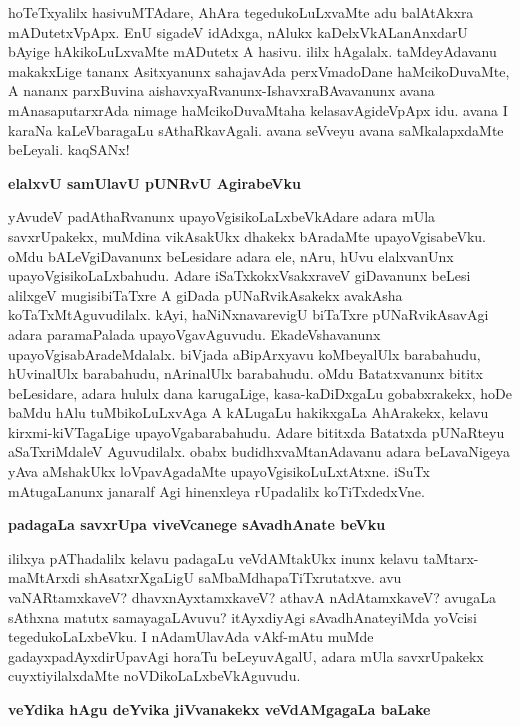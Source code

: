 \noindent
hoTeTxyalilx hasivuMTAdare, AhAra tegedukoLuLxvaMte adu balAtAkxra mADutetxVpApx. EnU sigadeV idAdxga, nAlukx kaDelxVkALanAnxdarU bAyige hAkikoLuLxvaMte mADutetx A hasivu. ililx hAgalalx. taMdeyAdavanu makakxLige tananx Asitxyanunx sahajavAda perxVmadoDane haMcikoDuvaMte, A nananx parxBuvina aishavxyaRvanunx-IshavxraBAvavanunx avana mAnasaputarxrAda nimage haMcikoDuvaMtaha kelasavAgideVpApx idu. avana I karaNa kaLeVbaragaLu sAthaRkavAgali. avana seVveyu avana saMkalapxdaMte beLeyali. kaqSANx!

\newpage

{\bigskip
\noindent
{\large\bf elalxvU samUlavU pUNRvU AgirabeVku}}\label{page190b}
\medskip

\noindent
yAvudeV padAthaRvanunx upayoVgisikoLaLxbeVkAdare adara mUla savxrUpakekx, muMdina vikAsakUkx dhakekx bAradaMte upayoVgisabeVku. oMdu bALeVgiDavanunx beLesidare adara ele, nAru, hUvu elalxvanUnx upayoVgisikoLaLxbahudu. Adare iSaTxkokxVsakxraveV giDavanunx beLesi alilxgeV mugisibiTaTxre A giDada pUNaRvikAsakekx avakAsha koTaTxMtAguvudilalx. kAyi, haNiNxnavarevigU biTaTxre pUNaRvikAsavAgi adara paramaPalada upayoVgavAguvudu. EkadeVshavanunx upayoVgisabAradeMdalalx. biVjada aBipArxyavu koMbeyalUlx barabahudu, hUvinalUlx barabahudu, nArinalUlx barabahudu. oMdu Batatxvanunx bititx beLesidare, adara hululx dana karugaLige, kasa-kaDiDxgaLu gobabxrakekx, hoDe baMdu hAlu tuMbikoLuLxvAga A kALugaLu hakikxgaLa AhArakekx, kelavu kirxmi-kiVTagaLige upayoVgabarabahudu. Adare bititxda Batatxda pUNaRteyu aSaTxriMdaleV Aguvudilalx. obabx budidhxvaMtanAdavanu adara beLavaNigeya yAva aMshakUkx loVpavAgadaMte upayoVgisikoLuLxtAtxne. iSuTx mAtugaLanunx janaralf Agi hinenxleya rUpadalilx koTiTxdedxVne.

\eject

{\bigskip
\noindent
{\large\bf padagaLa savxrUpa viveVcanege sAvadhAnate beVku}}\label{page191}
\medskip

\noindent
ililxya pAThadalilx kelavu padagaLu veVdAMtakUkx inunx kelavu taMtarx-maMtArxdi shAsatxrXgaLigU saMbaMdhapaTiTxrutatxve. avu vaNARtamxkaveV? dhavxnAyxtamxkaveV? athavA nAdAtamxkaveV? avugaLa sAthxna matutx samayagaLAvuvu? itAyxdiyAgi sAvadhAnateyiMda yoVcisi tegedukoLaLxbeVku. I nAdamUlavAda vAkf-mAtu muMde gadayxpadAyxdirUpavAgi horaTu beLeyuvAgalU, adara mUla savxrUpakekx cuyxtiyilalxdaMte noVDikoLaLxbeVkAguvudu.

{\bigskip
\noindent
{\large\bf veYdika hAgu deYvika jiVvanakekx veVdAMgagaLa baLake}}\label{page191a}
\medskip

